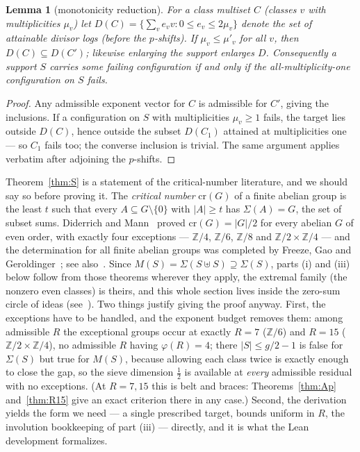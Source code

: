 \documentclass[11pt]{article}
\theoremstyle{plain}
\newtheorem{lemma}[theorem]{Lemma}
\theoremstyle{remark}
\theoremstyle{plain}
\numberwithin{equation}{section}
\begin{document}
\begin{lemma}[monotonicity reduction]\label{lem:mono}
For a class multiset $C$ (classes $v$ with multiplicities $\mu_v$) let
$D(C) = \{\sum_v e_v v : 0 \le e_v \le 2\mu_v\}$ denote the set of
attainable divisor logs (before the $p$-shifts). If $\mu_v \le \mu'_v$
for all $v$, then $D(C) \subseteq D(C')$; likewise enlarging the support
enlarges $D$. Consequently a support $S$ carries \emph{some} failing
configuration if and only if the all-multiplicity-one configuration on
$S$ fails.
\end{lemma}

\begin{proof}
Any admissible exponent vector for $C$ is admissible for $C'$, giving
the inclusions. If a configuration on $S$ with multiplicities
$\mu_v \ge 1$ fails, the target lies outside $D(C)$, hence outside the
subset $D(C_1)$ attained at multiplicities one --- so $C_1$ fails too;
the converse inclusion is trivial. The same argument applies verbatim
after adjoining the $p$-shifts.
\end{proof}

Theorem~\ref{thm:S} is a statement of the critical-number
literature, and we should say so before proving it. The
\emph{critical number} $\mathrm{cr}(G)$ of a finite abelian group is
the least $t$ such that every $A \subseteq G \setminus \{0\}$ with
$|A| \ge t$ has $\Sigma(A) = G$, the set of subset sums. Diderrich and
Mann~\cite{DiderrichMann} proved $\mathrm{cr}(G) = |G|/2$ for every
abelian $G$ of even order, with exactly four exceptions ---
$\mathbb{Z}/4$, $\mathbb{Z}/6$, $\mathbb{Z}/8$ and
$\mathbb{Z}/2 \times \mathbb{Z}/4$ --- and the determination for all
finite abelian groups was completed by Freeze, Gao and
Geroldinger~\cite{FGG}; see also~\cite{GHLS}. Since
$M(S) = \Sigma(S \uplus S) \supseteq \Sigma(S)$, parts (i) and (iii)
below follow from those theorems wherever they apply, the extremal
family (the nonzero even classes) is theirs, and this whole section
lives inside the zero-sum circle of ideas
(see~\cite[Ch.~6, 16]{Grynkiewicz}). Two things justify giving the
proof anyway. First, the exceptions have to be handled, and the
exponent budget removes them: among admissible $R$ the exceptional
groups occur at exactly $R = 7$ ($\mathbb{Z}/6$) and $R = 15$
($\mathbb{Z}/2 \times \mathbb{Z}/4$), no admissible $R$ having
$\varphi(R) = 4$; there $|S| \le g/2 - 1$ is false for $\Sigma(S)$ but
true for $M(S)$, because allowing each class twice is exactly enough
to close the gap, so the sieve dimension $\tfrac12$ is available at
\emph{every} admissible residual with no exceptions. (At $R = 7, 15$
this is belt and braces: Theorems~\ref{thm:Ap} and~\ref{thm:R15} give
an exact criterion there in any case.) Second, the derivation yields
the form we need --- a single prescribed target, bounds uniform in
$R$, the involution bookkeeping of part (iii) --- directly, and it is
what the Lean development formalizes.
\end{document}
